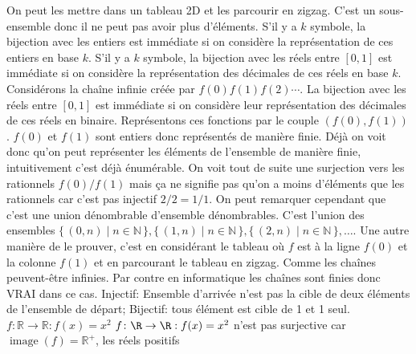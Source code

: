 \begin{mcqs}
  {On peut les mettre dans un tableau 2D et les parcourir en zigzag.}
  {C'est un sous-ensemble donc il ne peut pas avoir plus d'éléments.}
  {S'il y a $k$ symbole, la bijection avec les entiers est immédiate si on considère la représentation de ces entiers en base $k$.}
  {S'il y a $k$ symbole, la bijection avec les réels entre $[0,1]$ est immédiate si on considère la représentation des décimales de ces réels en base $k$.}
  {Considérons la chaîne infinie créée par $f(0)f(1)f(2)\cdots$. La bijection avec les réels entre $[0,1]$ est immédiate si on considère leur représentation des décimales de ces réels en binaire.}
  {Représentons ces fonctions par le couple $(f(0),f(1))$.
  $f(0)$ et $f(1)$ sont entiers donc représentés de manière finie.
  Déjà on voit donc qu'on peut représenter les éléments de l'ensemble de manière finie, intuitivement c'est déjà énumérable.
  On voit tout de suite une surjection vers les rationnels $f(0)/f(1)$
  mais ça ne signifie pas qu'on a moins d'éléments que les rationnels car c'est pas injectif $2/2 = 1/1$.
  On peut remarquer cependant que c'est une union dénombrable d'ensemble dénombrables.
  C'est l'union des ensembles
  $\{\, (0,n) \mid n \in \mathbb{N} \,\},
   \{\, (1,n) \mid n \in \mathbb{N} \,\},
   \{\, (2,n) \mid n \in \mathbb{N} \,\},\ldots$.
  Une autre manière de le prouver, c'est en considérant le tableau où $f$ est à la ligne $f(0)$ et la colonne $f(1)$ et en parcourant le tableau en zigzag.}
  {Comme les chaînes peuvent-être infinies. Par contre en informatique les chaînes sont finies donc VRAI dans ce cas.}
  {Injectif: Ensemble d'arrivée n'est pas la cible de deux éléments de l'ensemble de départ; Bijectif: tous élément est cible de 1 et 1 seul.}
  {$f\colon \mathbb{R}\rightarrow\mathbb{R} : f(x)=x^{2}$}
  {$f\colon \R \to \R : f(x) = x^2$ n'est pas surjective car $\mathop{\mathrm{image}}(f) = \mathbb{R}^+$, les réels positifs
}
\end{mcqs}

